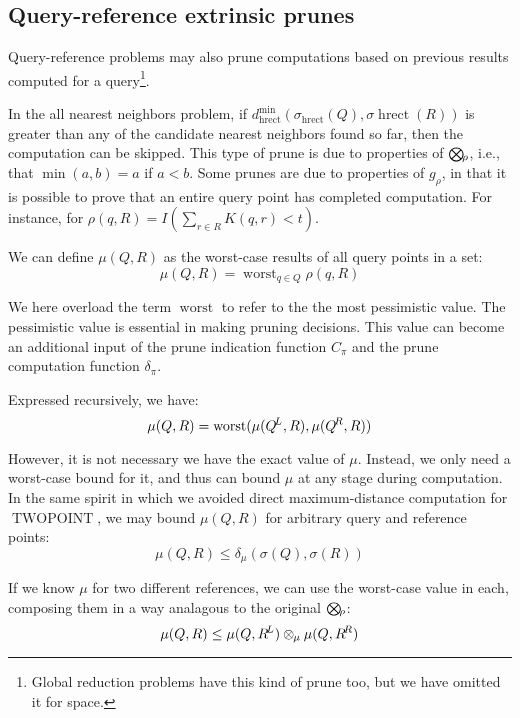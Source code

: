 \documentclass[times, 10pt,twocolumn]{article}
\DeclareMathOperator*{\worst}{worst}
\DeclareMathOperator{\TWOPT}{TWOPOINT}
\DeclareMathOperator{\hrect}{hrect}
\newcommand{\kdleft}{\hspace{-0.02in}^L}
\newcommand{\kdright}{\hspace{-0.02in}^R}
\newcommand{\myOp}[1]{\mathop{\bigotimes\nolimits\hspace{-0.045in}_{#1}}}
\newcommand{\myop}[1]{\otimes\hspace{-0.04in}_{#1}\hspace{0.03in}}
\newcommand{\allpi}{\pi}
\newcommand{\canprunepi}{C_{\allpi}}
\newcommand{\deltapi}{\delta_{\allpi}}
\newcommand{\allrho}{\rho}
\newcommand{\Oprho}{\myOp{\rho}}
\newcommand{\grho}{g_{\rho}}
\newcommand{\allmu}{\mu}
\newcommand{\opmu}{\myop{\mu}}
\newcommand{\deltamu}{\delta_{\mu}}
\newcommand{\allsigma}{\sigma}
\begin{document}
\subsection{Query-reference extrinsic prunes}

Query-reference problems may also prune computations based on previous results computed for a query\footnote{Global reduction problems have this kind of prune too, but we have omitted it for space.}.

In the all nearest neighbors problem, if $d^{\min}_{\hrect}(\allsigma_{\hrect}(Q), \allsigma{\hrect}(R))$ is greater than any of the candidate nearest neighbors found so far, then the computation can be skipped.
This type of prune is due to properties of $\Oprho$, i.e., that $\min(a, b) = a$ if $a < b$.
Some prunes are due to properties of $\grho$, in that it is possible to prove that an entire query point has completed computation.
For instance, for $\rho(q, R) = I(\sum_{r \in R} K(q, r) < t)$.

We can define $\allmu(Q, R)$ as the worst-case results of all query points in a set:
 \begin{equation}
\allmu(Q, R) = \worst_{q \in Q} \allrho(q, R)
\label{eqn:defmu}
\end{equation}

\noindent We here overload the term $\worst$ to refer to the the most pessimistic value.
The pessimistic value is essential in making pruning decisions.
This value can become an additional input of the prune indication function $\canprunepi$ and the prune computation function $\deltapi$.

Expressed recursively, we have:
\begin{equation}
\allmu(Q, R) = \worst(\allmu(Q\kdleft, R), \allmu(Q\kdright, R))
\label{eqn:dividemu}
\end{equation}

\noindent However, it is not necessary we have the exact value of $\allmu$.
Instead, we only need a worst-case bound for it, and thus can bound $\allmu$ at any stage during computation.
In the same spirit in which we avoided direct maximum-distance computation for $\TWOPT$, we may bound $\allmu(Q, R)$ for arbitrary query and reference points:
\begin{equation}
\allmu(Q, R) \leq \deltamu(\sigma(Q), \sigma(R))
\label{eqn:approxmu}
\end{equation}

\noindent If we know $\allmu$ for two different references, we can use the worst-case value in each, composing them in a way analagous to the original $\Oprho$:
\begin{equation}
\allmu(Q, R) \leq \allmu(Q, R\kdleft) \opmu \allmu(Q, R\kdright)
\label{eqn:combinemu}
\end{equation}
\end{document}
